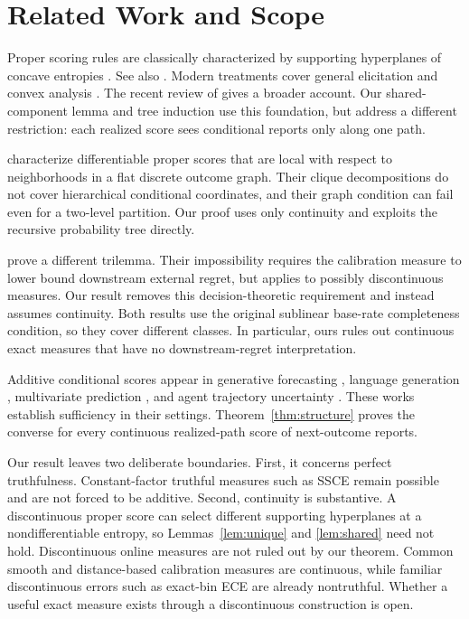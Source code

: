 \documentclass[twoside]{article}
\newcommand{\1}{\mathbf 1}
\begin{document}
\section{Related Work and Scope}
\label{sec:related}

Proper scoring rules are classically characterized by supporting hyperplanes of concave entropies \citep{savage1971elicitation}. See also \citet{gneiting2007strictly}. Modern treatments cover general elicitation and convex analysis \citep{frongillo2014general}. The recent review of \citet{waghmare2025proper} gives a broader account. Our shared-component lemma and tree induction use this foundation, but address a different restriction: each realized score sees conditional reports only along one path.

\citet{dawid2012local} characterize differentiable proper scores that are local with respect to neighborhoods in a flat discrete outcome graph. Their clique decompositions do not cover hierarchical conditional coordinates, and their graph condition can fail even for a two-level partition. Our proof uses only continuity and exploits the recursive probability tree directly.

\citet{qiao2025decision} prove a different trilemma. Their impossibility requires the calibration measure to lower bound downstream external regret, but applies to possibly discontinuous measures. Our result removes this decision-theoretic requirement and instead assumes continuity. Both results use the original sublinear base-rate completeness condition, so they cover different classes. In particular, ours rules out continuous exact measures that have no downstream-regret interpretation.

Additive conditional scores appear in generative forecasting \citep{pacchiardi2024probabilistic}, language generation \citep{shao2024language}, multivariate prediction \citep{roordink2023scoring}, and agent trajectory uncertainty \citep{raghu2026agentic}. These works establish sufficiency in their settings. Theorem~\ref{thm:structure} proves the converse for every continuous realized-path score of next-outcome reports.

Our result leaves two deliberate boundaries. First, it concerns perfect truthfulness. Constant-factor truthful measures such as SSCE remain possible and are not forced to be additive. Second, continuity is substantive. A discontinuous proper score can select different supporting hyperplanes at a nondifferentiable entropy, so Lemmas~\ref{lem:unique} and \ref{lem:shared} need not hold. Discontinuous online measures are not ruled out by our theorem. Common smooth and distance-based calibration measures are continuous, while familiar discontinuous errors such as exact-bin ECE are already nontruthful. Whether a useful exact measure exists through a discontinuous construction is open.
\end{document}
